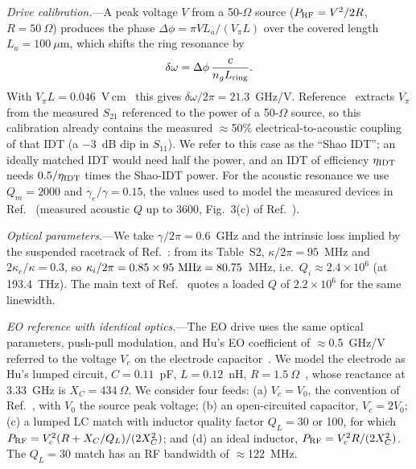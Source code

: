 \documentclass[aps,prapplied,reprint,superscriptaddress,amsmath,amssymb,floatfix]{revtex4-2}
\newcommand{\Pg}{P_{\rm RF}}
\begin{document}
\emph{Drive calibration.}---A peak voltage $V$ from a 50-$\Omega$ source ($\Pg=V^2/2R$, $R=50~\Omega$) produces the phase $\Delta\phi=\pi V L_a/(V_\pi L)$ over the covered length $L_a=100~\mu$m, which shifts the ring resonance by
\begin{equation}
\delta\omega=\Delta\phi\,\frac{c}{n_g L_{\rm ring}} .
\label{eq:cal}
\end{equation}
With $V_\pi L=0.046$~V\,cm~\cite{Shao2019} this gives $\delta\omega/2\pi=21.3$~GHz/V. Reference~\cite{Shao2019} extracts $V_\pi$ from the measured $S_{21}$ referenced to the power of a 50-$\Omega$ source, so this calibration already contains the measured $\approx$50\% electrical-to-acoustic coupling of that IDT (a $-3$~dB dip in $S_{11}$). We refer to this case as the ``Shao IDT''; an ideally matched IDT would need half the power, and an IDT of efficiency $\eta_{\rm IDT}$ needs $0.5/\eta_{\rm IDT}$ times the Shao-IDT power. For the acoustic resonance we use $Q_m=2000$ and $\gamma_e/\gamma=0.15$, the values used to model the measured devices in Ref.~\cite{Shao2019} (measured acoustic $Q$ up to 3600, Fig.~3(c) of Ref.~\cite{Shao2019}).

\emph{Optical parameters.}---We take $\gamma/2\pi=0.6$~GHz and the intrinsic loss implied by the suspended racetrack of Ref.~\cite{Shao2019}: from its Table~S2, $\kappa/2\pi=95$~MHz and $2\kappa_e/\kappa=0.3$, so $\kappa_i/2\pi=0.85\times95~{\rm MHz}=80.75$~MHz, i.e.\ $Q_i\approx2.4\times10^6$ (at 193.4~THz). The main text of Ref.~\cite{Shao2019} quotes a loaded $Q$ of $2.2\times10^6$ for the same linewidth.

\emph{EO reference with identical optics.}---The EO drive uses the same optical parameters, push-pull modulation, and Hu's EO coefficient of $\approx$0.5~GHz/V referred to the voltage $V_c$ on the electrode capacitor~\cite{Hu2021}. We model the electrode as Hu's lumped circuit, $C=0.11$~pF, $L=0.12$~nH, $R=1.5~\Omega$~\cite{Hu2021}, whose reactance at 3.33~GHz is $X_C=434~\Omega$. We consider four feeds: (a) $V_c=V_0$, the convention of Ref.~\cite{Hu2021}, with $V_0$ the source peak voltage; (b) an open-circuited capacitor, $V_c=2V_0$; (c) a lumped LC match with inductor quality factor $Q_L=30$ or 100, for which $\Pg=V_c^2(R+X_C/Q_L)/(2X_C^2)$; and (d) an ideal inductor, $\Pg=V_c^2R/(2X_C^2)$. The $Q_L=30$ match has an RF bandwidth of $\approx$122~MHz.

\end{document}
